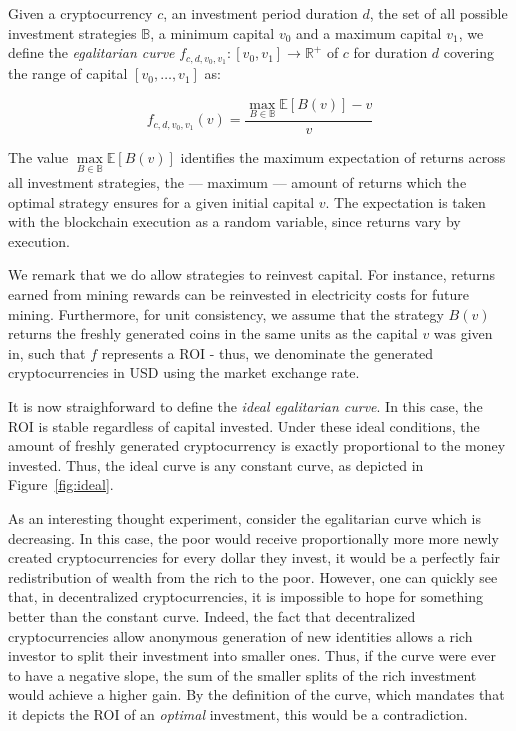 \begin{definition}
    Given a cryptocurrency $c$, an investment period duration $d$, the set of
    all possible investment strategies $\mathbb{B}$, a minimum capital $v_0$
    and a maximum capital $v_1$, we define the \emph{egalitarian curve}
    $f_{c,d,v_0,v_1}: [v_0, v_1] \longrightarrow \mathbb{R}^+$ of $c$ for
    duration $d$ covering the range of capital $[v_0, \dots, v_1]$ as:

    \[
        f_{c,d,v_0,v_1}(v) = \frac{\underset{B \in \mathbb{B}}{\max}{\mathbb{E}[B(v)]} - v}{v}
    \]
\end{definition}

The value $\underset{B \in \mathbb{B}}{\max}{\mathbb{E}[B(v)]}$ identifies the maximum expectation of
returns across all investment strategies, \ie the --- maximum --- amount of
returns which the optimal strategy ensures for a given initial capital $v$.
The expectation is taken with the blockchain execution as a random variable,
since returns vary by execution.

We remark that we do allow strategies to reinvest capital. For instance,
returns earned from mining rewards can be reinvested in electricity costs for
future mining. Furthermore, for unit consistency, we assume that the strategy
$B(v)$ returns the freshly generated coins in the same units as the capital $v$
was given in, such that $f$ represents a ROI - thus, we denominate the
generated cryptocurrencies in USD using the market exchange rate.

It is now straighforward to define the \emph{ideal egalitarian curve}. In this
case, the ROI is stable regardless of capital invested. Under these ideal
conditions, the amount of freshly generated cryptocurrency is exactly
proportional to the money invested. Thus, the ideal curve is any constant
curve, as depicted in Figure~\ref{fig:ideal}.

As an interesting thought experiment, consider the egalitarian curve which is
decreasing. In this case, the poor would receive proportionally more more newly
created cryptocurrencies for every dollar they invest, \ie it would be a
perfectly fair redistribution of wealth from the rich to the poor. However, one
can quickly see that, in decentralized cryptocurrencies, it is impossible to
hope for something better than the constant curve. Indeed, the fact that
decentralized cryptocurrencies allow anonymous generation of new identities
allows a rich investor to split their investment into smaller ones.  Thus, if
the curve were ever to have a negative slope, the sum of the smaller splits of
the rich investment would achieve a higher gain. By the definition of the
curve, which mandates that it depicts the ROI of an \emph{optimal} investment,
this would be a contradiction.

